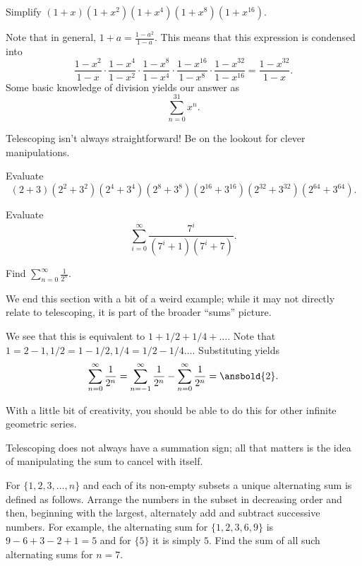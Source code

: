 \documentclass[blue,onecol]{shooting}
\begin{document}
\begin{exam}
Simplify $(1+x)(1+x^2)(1+x^4)(1+x^8)(1+x^{16}).$
\end{exam}

\begin{sol}
Note that in general, $1+a=\frac{1-a^2}{1-a}.$ This means that this expression is condensed into \[\frac{1-x^2}{1-x}\cdot \frac{1-x^4}{1-x^2}\cdot \frac{1-x^8}{1-x^4}\cdot \frac{1-x^{16}}{1-x^8} \cdot \frac {1-x^{32}}{1-x^{16}}=\frac{1-{x^{32}}}{1-x}.\] Some basic knowledge of division yields our answer as \[\sum\limits_{n=0}^{31} x^n.\]
\end{sol}

Telescoping isn't always straightforward! Be on the lookout for clever manipulations.

\begin{exer}[AMC 10A 2021/10]
Evaluate
\[(2+3)(2^2+3^2)(2^4+3^4)(2^8+3^8)(2^{16}+3^{16})(2^{32}+3^{32})(2^{64}+3^{64}).\]
\end{exer}

\begin{exer}[CMIMC 2021/T3]
Evaluate \[\sum_{i=0}^{\infty}\frac{7^i}{(7^i+1)(7^i+7)}.\]
\end{exer}

\begin{exam}
Find $\sum\limits_{n=0}^{\infty} \frac{1}{2^n}.$
\end{exam}

We end this section with a bit of a weird example; while it may not directly relate to telescoping, it is part of the broader ``sums'' picture.

\begin{sol}
We see that this is equivalent to $1+1/2+1/4+\dots.$ Note that $1=2-1,1/2=1-1/2,1/4=1/2-1/4\dots.$ Substituting yields \[\sum\limits_{n=0}^{\infty}\frac{1}{2^n}=\sum\limits_{n=-1}^{\infty} \frac{1}{2^n}-\sum\limits_{n=0}^{\infty}\frac{1}{2^n}=\ansbold{2}.\]

With a little bit of creativity, you should be able to do this for other infinite geometric series.
\end{sol}

Telescoping does not always have a summation sign; all that matters is the idea of manipulating the sum to cancel with itself.

\begin{exam}[AIME 1983/13]
For $\{1, 2, 3, \ldots, n\}$ and each of its non-empty subsets a unique alternating sum is defined as follows. Arrange the numbers in the subset in decreasing order and then, beginning with the largest, alternately add and subtract successive numbers. For example, the alternating sum for $\{1, 2, 3, 6,9\}$ is $9-6+3-2+1=5$ and for $\{5\}$ it is simply $5$. Find the sum of all such alternating sums for $n=7$. 
\end{exam}
\end{document}
